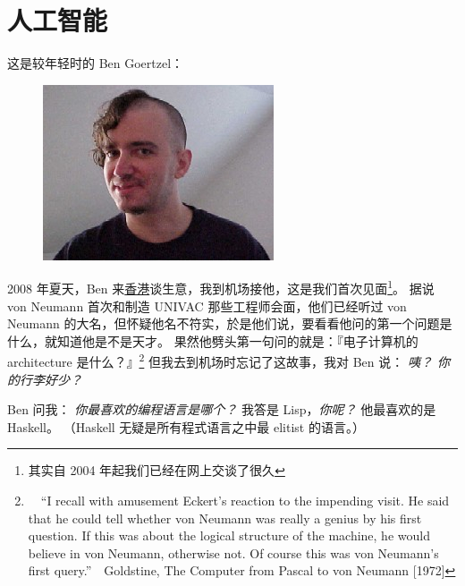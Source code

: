 \documentclass[12pt]{report}
\newcommand{\speechCn}[1]{\textrm{\textit{\textcolor{Speech}{#1}}}}
\newcommand*\dashh{\,\,\textemdash\kern-1pt\textemdash\,\,}
\begin{document}
{

\chapter{人工智能}

这是较年轻时的 Ben Goertzel：
\begin{figure}[H]
\centering
\includegraphics[scale=2.5]{benbenben.jpg}
\end{figure}

2008 年夏天，Ben 来\uline{香港}谈生意，我到机场接他，这是我们首次见面\footnote{其实自 2004 年起我们已经在网上交谈了很久}。 据说 von Neumann 首次和制造 UNIVAC 那些工程师会面，他们已经听过 von Neumann 的大名，但怀疑他名不符实，於是他们说，要看看他问的第一个问题是什么，就知道他是不是天才。  果然他劈头第一句问的就是：『电子计算机的 architecture 是什么？』\footnote{\ \  ``I recall with amusement Eckert's reaction to the impending visit. He said that he could tell whether von Neumann was really a genius by his first question. If this was about the logical structure of the machine, he would believe in von Neumann, otherwise not. Of course this was von Neumann's first query.'' \dashh Goldstine, The Computer from Pascal to von Neumann [1972]}  但我去到机场时忘记了这故事，我对 Ben 说： \speechCn{咦？ 你的行李好少？}

Ben 问我： \speechCn{你最喜欢的编程语言是哪个？} 我答是 Lisp，\speechCn{你呢？} 他最喜欢的是 Haskell。 （Haskell 无疑是所有程式语言之中最 elitist 的语言。）

}
\end{document}
